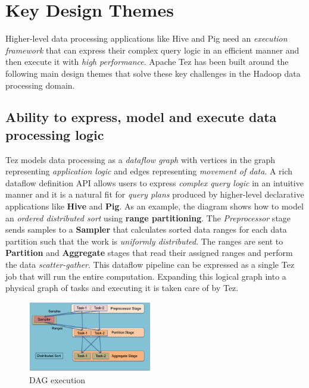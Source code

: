 \documentclass[twocolumn]{article}
\begin{document}
\section{Key Design Themes}

Higher-level data processing applications like Hive and Pig need an
\textit{execution framework} that can express their complex query logic in an
efficient manner and then execute it with \textit{high performance}. 
Apache Tez has been built around the following main design themes that solve these
key challenges in the Hadoop data processing domain.

\subsection{Ability to express, model and execute data processing logic}

Tez models data processing as a \emph{dataflow graph} with vertices in
the graph representing \emph{application logic} and edges representing
\emph{movement of data}. A rich dataflow definition API allows users to
express \emph{complex query logic} in an intuitive manner and it is a
natural fit for \emph{query plans} produced by higher-level declarative
applications like \textbf{Hive} and \textbf{Pig}. As an example, the
diagram shows how to model an \emph{ordered distributed sort} using
\textbf{range partitioning}. The \emph{Preprocessor} stage sends samples
to a \textbf{Sampler} that calculates sorted data ranges for each data
partition such that the work is \emph{uniformly distributed}. The ranges
are sent to \textbf{Partition} and \textbf{Aggregate} stages that read
their assigned ranges and perform the data \emph{scatter-gather}. This
dataflow pipeline can be expressed as a single Tez job that will run the
entire computation. Expanding this logical graph into a physical graph
of tasks and executing it is taken care of by Tez.

\begin{figure}[htb]
        \centering
        \includegraphics[width=0.48\textwidth]{tez1}
        \caption{DAG execution}
        \label{fig03}
\end{figure}
\end{document}
